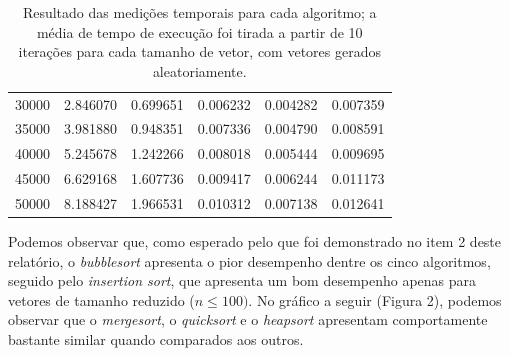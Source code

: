 \documentclass[fontsize=10pt]{article}
\begin{document}
\begin{table}[!htbp]
\begin{tabular}{@{}r|ccccc@{}}
30000                           & 2.846070             & 0.699651                & 0.006232            & 0.004282            & 0.007359           \\
35000                           & 3.981880             & 0.948351                & 0.007336            & 0.004790            & 0.008591           \\
40000                           & 5.245678             & 1.242266                & 0.008018            & 0.005444            & 0.009695           \\
45000                           & 6.629168             & 1.607736                & 0.009417            & 0.006244            & 0.011173           \\
50000                           & 8.188427             & 1.966531                & 0.010312            & 0.007138            & 0.012641          
\end{tabular}
\caption{Resultado das medições temporais para cada algoritmo; a média de tempo de execução foi tirada a partir de 10 iterações para cada tamanho de vetor, com vetores gerados aleatoriamente.}
\label{Tabela 2}
\end{table}

\quad Podemos observar que, como esperado pelo que foi demonstrado no item 2 deste relatório, o \textit{bubblesort} apresenta o pior desempenho dentre os cinco algoritmos, seguido pelo \textit{insertion sort}, que apresenta um bom desempenho apenas para vetores de tamanho reduzido ($n \leq 100)$. No gráfico a seguir (Figura 2), podemos observar que o \textit{mergesort}, o \textit{quicksort} e o \textit{heapsort} apresentam comportamente bastante similar quando comparados aos outros.
\end{document}
